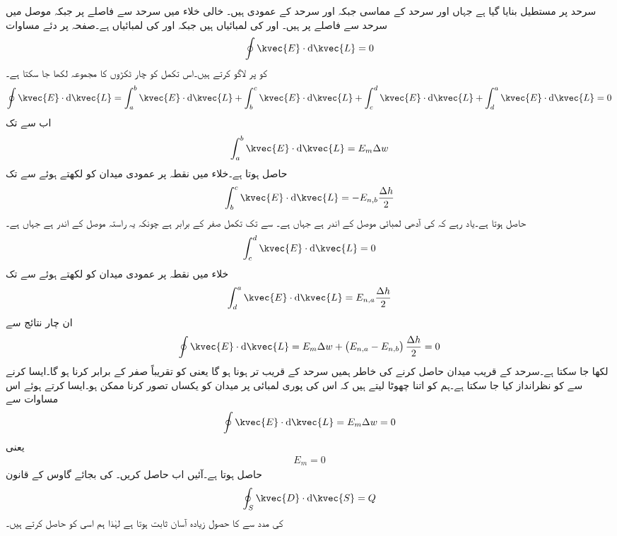  سرحد پر   مستطیل بنایا گیا ہے جہاں  اور  سرحد کے مماسی جبکہ  اور  سرحد کے عمودی ہیں۔ خالی خلاء میں سرحد سے  فاصلے پر جبکہ  موصل میں سرحد سے   فاصلے پر  ہیں۔ اور  کی لمبائیاں  ہیں جبکہ  اور  کی لمبائیاں  ہے۔صفحہ  پر دئے مساوات  
\begin{align*}
\oint \kvec{E} \cdot \dif \kvec{L}=0
\end{align*}
کو  پر  لاگو کرتے ہیں۔اس تکمل کو چار ٹکڑوں کا مجموعہ لکھا جا سکتا ہے۔
   \begin{align*}
\oint \kvec{E} \cdot \dif \kvec{L}=\int_a^b \kvec{E} \cdot \dif \kvec{L}+\int_b^c \kvec{E} \cdot \dif \kvec{L}+\int_c^d \kvec{E} \cdot \dif \kvec{L}+\int_d^a \kvec{E} \cdot \dif \kvec{L}=0
\end{align*}
اب  سے  تک
\begin{align*}
\int_a^b\kvec{E} \cdot \dif \kvec{L}=E_m \Delta w
\end{align*}
حاصل ہوتا ہے۔خلاء میں نقطہ   پر عمودی میدان کو  لکھتے ہوئے  سے  تک
\begin{align*}
\int_b^c\kvec{E} \cdot \dif \kvec{L}=-E_{n,b} \frac{\Delta h}{2}
\end{align*}
حاصل ہوتا ہے۔یاد رہے کہ  کی آدھی لمبائی موصل کے اندر ہے جہاں  ہے۔ سے  تک تکمل صفر کے برابر ہے چونکہ یہ راستہ موصل کے اندر ہے جہاں  ہے۔
\begin{align*}
\int_c^d\kvec{E} \cdot \dif \kvec{L}=0
\end{align*}
خلاء میں نقطہ   پر عمودی میدان کو  لکھتے ہوئے  سے  تک
\begin{align*}
\int_d^a\kvec{E} \cdot \dif \kvec{L}=E_{n,a} \frac{\Delta h}{2}
\end{align*}
ان چار نتائج سے
\begin{align*}
\oint \kvec{E} \cdot \dif \kvec{L}=E_m \Delta w+\left(E_{n,a}-E_{n,b} \right) \frac{\Delta h}{2}=0
\end{align*}
لکھا جا سکتا ہے۔سرحد کے قریب میدان حاصل کرنے کی خاطر ہمیں سرحد کے قریب تر ہونا ہو گا یعنی  کو تقریباً صفر کے برابر کرنا ہو گا۔ایسا کرنے
 سے  کو نظرانداز  کیا جا سکتا ہے۔ہم  کو اتنا چھوٹا لیتے ہیں کہ اس کی پوری لمبائی پر میدان کو یکساں تصور کرنا ممکن ہو۔ایسا کرتے ہوئے اس مساوات سے
\begin{align*}
\oint \kvec{E} \cdot \dif \kvec{L}=E_m \Delta w=0
\end{align*}
یعنی
\begin{align}\label{مساوات_کپیسٹر_سرحد_موصل_خلاء_مماسی_میدان_صفر}
E_m=0
\end{align}
حاصل ہوتا ہے۔آئیں اب  حاصل کریں۔ کی بجائے گاوس کے قانون
\begin{align*}
\oint_S \kvec{D} \cdot \dif \kvec{S}=Q
\end{align*}
 کی مدد سے  کا حصول زیادہ آسان ثابت ہوتا ہے لہٰذا ہم اسی کو حاصل کرتے ہیں۔

